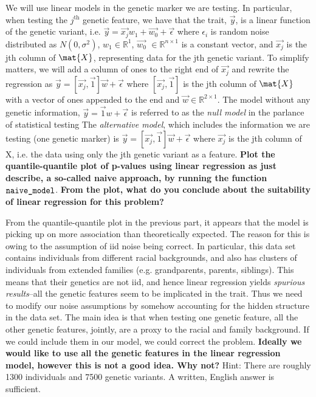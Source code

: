 \documentclass[preview]{standalone}
\begin{document}
\begin{Parts}
	\Part We will use linear models in the genetic marker we are testing. In particular, when testing the $j^{\text{th}}$ genetic feature, we have that the trait, $\vec{y}$, is a linear function of the genetic variant, i.e. $ \vec{y} = \vec{x_j} w_1 + \vec{w_0} + \vec{\epsilon}$ where $\epsilon_i$ is random noise distributed as $N(0, \sigma^2)$, $w_1 \in \mathbb{R}^{1}$, $\vec{w_0}$ $\in \mathbb{R}^{n \times 1}$ is a constant vector, and $\vec{x_j}$ is the jth column of $\mat{X}$, representing data for the jth genetic variant. To simplify matters, we will add a column of ones to the right end of $\vec{x_j}$ and rewrite the regression as $\vec{y}=[\vec{x_j}, \vec{1}] \vec{w} + \vec{\epsilon}$ where $[\vec{x_j}, \vec{1}]$ is the jth column of $\mat{X}$ with a vector of ones appended to the end and $\vec{w} \in \mathbb{R}^{2 \times 1}$. The model without any genetic information, $\vec{y} = \vec{1}w + \vec{\epsilon}$ is referred to as the \emph{null model} in the parlance of statistical testing The \emph{alternative model}, which includes the information we are testing (one genetic marker) is $\vec{y} = [\vec{x_j}, \vec{1}] \vec{w} + \vec{\epsilon}$ where $\vec{x_j}$ is the jth column of X, i.e. the data using only the jth genetic variant as a feature. \textbf{Plot the quantile-quantile plot of p-values using linear regression as just describe, a so-called naive approach, by running the function} $\verb|naive_model|$. \textbf{From the plot, what do you conclude about the suitability of linear regression for this problem?}

	
	
	
	
	
	
	
	
	\Part From the quantile-quantile plot in the previous part, it appears that the model is picking up on more association than theoretically expected. The reason for this is owing to the assumption of iid noise being correct. In particular, this data set contains individuals from different racial backgrounds, and also has clusters of individuals from extended families (e.g. grandparents, parents, siblings). This means that their genetics are not iid, and hence linear regression yields \emph{spurious results}--all the genetic features seem to be implicated in the trait. Thus we need to modify our noise assumptions by somehow accounting for the hidden structure in the data set. The main idea is that when testing one genetic feature, all the other genetic features, jointly, are a proxy to the racial and family background. If we could include them in our model, we could correct the problem. \textbf{Ideally we would like to use all the genetic features in the linear regression model, however this is not a good idea. Why not?} Hint: There are roughly 1300 individuals and 7500 genetic variants. A written, English answer is sufficient.
	

\end{Parts}
\end{document}
